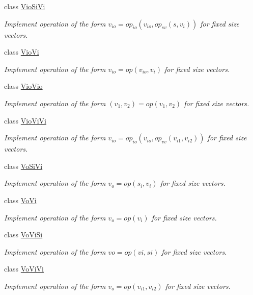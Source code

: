 \begin{DoxyCompactItemize}
class \hyperlink{classvct_fixed_size_vector_recursive_engines_1_1_vio_si_vi}{Vio\-Si\-Vi}
\begin{DoxyCompactList}\small\item\em Implement operation of the form $v_{io} = op_{io}(v_{io}, op_{sv}(s, v_i))$ for fixed size vectors. \end{DoxyCompactList}\item 
class \hyperlink{classvct_fixed_size_vector_recursive_engines_1_1_vio_vi}{Vio\-Vi}
\begin{DoxyCompactList}\small\item\em Implement operation of the form $v_{io} = op(v_{io}, v_i)$ for fixed size vectors. \end{DoxyCompactList}\item 
class \hyperlink{classvct_fixed_size_vector_recursive_engines_1_1_vio_vio}{Vio\-Vio}
\begin{DoxyCompactList}\small\item\em Implement operation of the form $(v_{1}, v_{2}) = op(v_{1}, v_{2})$ for fixed size vectors. \end{DoxyCompactList}\item 
class \hyperlink{classvct_fixed_size_vector_recursive_engines_1_1_vio_vi_vi}{Vio\-Vi\-Vi}
\begin{DoxyCompactList}\small\item\em Implement operation of the form $v_{io} = op_{io}(v_{io}, op_{vv}(v_{i1}, v_{i2}))$ for fixed size vectors. \end{DoxyCompactList}\item 
class \hyperlink{classvct_fixed_size_vector_recursive_engines_1_1_vo_si_vi}{Vo\-Si\-Vi}
\begin{DoxyCompactList}\small\item\em Implement operation of the form $v_o = op(s_i, v_i)$ for fixed size vectors. \end{DoxyCompactList}\item 
class \hyperlink{classvct_fixed_size_vector_recursive_engines_1_1_vo_vi}{Vo\-Vi}
\begin{DoxyCompactList}\small\item\em Implement operation of the form $v_o = op(v_i)$ for fixed size vectors. \end{DoxyCompactList}\item 
class \hyperlink{classvct_fixed_size_vector_recursive_engines_1_1_vo_vi_si}{Vo\-Vi\-Si}
\begin{DoxyCompactList}\small\item\em Implement operation of the form $vo = op(vi, si)$ for fixed size vectors. \end{DoxyCompactList}\item 
class \hyperlink{classvct_fixed_size_vector_recursive_engines_1_1_vo_vi_vi}{Vo\-Vi\-Vi}
\begin{DoxyCompactList}\small\item\em Implement operation of the form $v_o = op(v_{i1}, v_{i2})$ for fixed size vectors. \end{DoxyCompactList}\end{DoxyCompactItemize}


